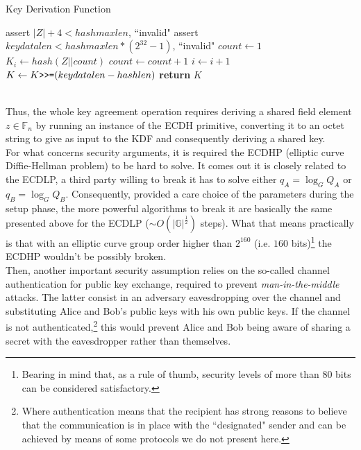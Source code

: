 \begin{algorithm}
	\caption{Key Derivation Function}
	\label{alg:KDF}
	\begin{algorithmic}[1]
		\State assert $|Z| + 4 < hashmaxlen $, ``invalid"
		\State assert $keydatalen < hashmaxlen * (2^{32} -1) $, ``invalid"
		\State $count \gets 1 $  
		\State $K_i \gets hash(Z||count)$
		\State $count \gets count + 1$
		\State $i \gets i + 1$
		\EndFor
		\State $K \gets K \verb|>>=| (keydatalen - hashlen)$ 
		\State \textbf{return} $K$ 
		\EndProcedure
	\end{algorithmic}
\end{algorithm}\\
Thus, the whole key agreement operation requires deriving a shared field element $z \in \mathbb{F}_n$ by running an instance of the ECDH primitive, converting it to an octet string to give as input to the KDF and consequently deriving a shared key.\\
For what concerns security arguments, it is required the ECDHP (elliptic curve Diffie-Hellman problem) to be hard to solve. It comes out it is closely related to the ECDLP, a third party willing to break it has to solve either $q_A = \log_G{Q_A}$ or $q_B = \log_G{Q_B}$. Consequently, provided a care choice of the parameters during the setup phase, the more powerful algorithms to break it are basically the same presented above for the ECDLP ($\sim O(|\mathbb{G}|^{\frac{1}{2}})$ steps). What that means practically is that with an elliptic curve group order higher than $2^{160}$ (i.e. $160$ bits)\footnote{Bearing in mind that, as a rule of thumb, security levels of more than 80 bits can be considered satisfactory.} the ECDHP wouldn't be possibly broken.\\ 
Then, another important security assumption relies on the so-called channel authentication for public key exchange, required to prevent \textit{man-in-the-middle} attacks. The latter consist in an adversary eavesdropping over the channel and substituting Alice and Bob's public keys with his own public keys. If the channel is not authenticated,\footnote{Where authentication means that the recipient has strong reasons to believe that the communication is in place with the ``designated" sender and can be achieved by means of some protocols we do not present here.} this would prevent Alice and Bob being aware of sharing a secret with the eavesdropper rather than themselves.